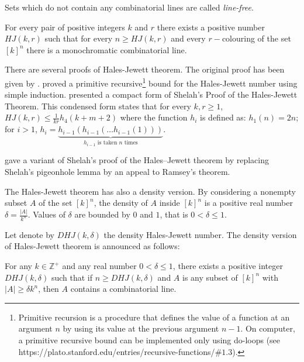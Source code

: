 Sets which do not contain any combinatorial lines are called  \textit{line-free}. 

\begin{thm}   For every pair of positive integers $k$ and $r$ there exists a positive number $HJ(k, r)$ such that for every $n \geq HJ(k, r)$ and every $r-$colouring of the set $[k]^n$ there is a
monochromatic combinatorial line.   \label{hj1} 	\end{thm}

There are several proofs of Hales-Jewett theorem. The original proof has been given by \cite{hales1987regularity}. \cite{shelah1988primitive} proved a primitive recursive\footnote{Primitive recursion is a procedure that defines the value of a function at an argument $n$ by using its value at the previous argument $n-1$.  On computer, a primitive recursive bound can be implemented only using do-loops (see https://plato.stanford.edu/entries/recursive-functions/$\#1.3$).} bound for the Hales-Jewett number using simple induction.
\cite{nilli1990shelah} presented a compact form of Shelah’s Proof of the Hales-Jewett Theorem.  This condensed form states that for every $k,r \geq 1$, $HJ(k,r) \leq \frac{1}{kr} h_4 (k+m+2)$ where  the function $h_i$ is defined as: $h_1(n)=2n$; for $i>1$, $h_i=\underbrace{h_{i-1}(h_{i-1}(\ldots h_{i-1}(1)))}_{h_{i-1} \text{ is taken } n \text{ times}} .$

 \cite{matet2007shelah} gave a variant of Shelah’s proof of the Hales–Jewett theorem by replacing Shelah’s pigeonhole lemma by an appeal to Ramsey’s theorem.

The Hales-Jewett theorem has also a density version. By considering a nonempty subset  $A$ of the set $[k]^n$, the density of $A$ inside $[k]^n$ is a positive real number $\delta=\frac{|A|}{k^n}$. Values of $\delta$ are bounded by $0$ and $1$, that is $0< \delta \leq 1.$ 

Let denote by $DHJ(k, \delta)$ the density Hales-Jewett number. The density version of Hales-Jewett theorem is announced as follows:

\begin{thm}   For any $k \in \mathbb{Z}^+$ and any real number $0< \delta \leq 1$,  there exists a positive integer $DHJ(k, \delta)$ such that if $n \geq DHJ(k,\delta)$ and $A$ is any subset of $[k] ^n$ with $|A| \geq \delta k^n$, then $A$ contains a combinatorial line.  \label{hj2}	\end{thm}

